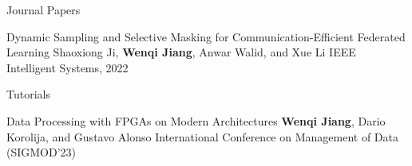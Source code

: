 \begin{rSection}{Journal Papers}
\begin{enumerate}[label={[\arabic*]}]

\item 
\begin{Pub}{Dynamic Sampling and Selective Masking for Communication-Efficient Federated Learning}
{Shaoxiong Ji, \textbf{Wenqi Jiang}, Anwar Walid, and Xue Li}
{IEEE Intelligent Systems, 2022 }
\end{Pub}\end{enumerate}
\end{rSection}



\begin{rSection}{Tutorials}

\begin{enumerate}[label={[\arabic*]}]

\item 
\begin{Pub}{Data Processing with FPGAs on Modern Architectures}
{\textbf{Wenqi Jiang}, Dario Korolija, and Gustavo Alonso}
{International Conference on Management of Data (SIGMOD'23)}
\end{Pub}\end{enumerate}
\end{rSection}


